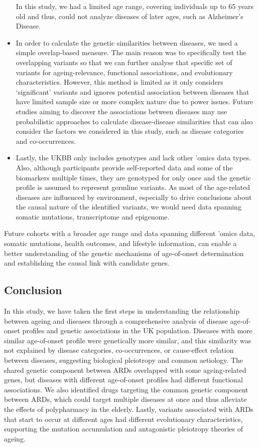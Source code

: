 \documentclass[12pt,twoside]{unicam}
\begin{document}
\begin{itemize}
  In this study, we had a limited age range, covering individuals up to 65 years old and thus, could not analyze diseases of later ages, such as Alzheimer's Disease.
\item
  In order to calculate the genetic similarities between diseases, we used a simple overlap-based measure. The main reason was to specifically test the overlapping variants so that we can further analyse that specific set of variants for ageing-relevance, functional associations, and evolutionary characteristics. However, this method is limited as it only considers `significant' variants and ignores potential association between diseases that have limited sample size or more complex nature due to power issues. Future studies aiming to discover the associations between diseases may use probabilistic approaches to calculate disease-disease similarities that can also consider the factors we considered in this study, such as disease categories and co-occurrences.
\item
  Lastly, the UKBB only includes genotypes and lack other 'omics data types. Also, although participants provide self-reported data and some of the biomarkers multiple times, they are genotyped for only once and the genetic profile is assumed to represent germline variants. As most of the age-related diseases are influenced by environment, especially to drive conclusions about the causal nature of the identified variants, we would need data spanning somatic mutations, transcriptome and epigenome.
\end{itemize}

Future cohorts with a broader age range and data spanning different 'omics data, somatic mutations, health outcomes, and lifestyle information, can enable a better understanding of the genetic mechanisms of age-of-onset determination and establishing the causal link with candidate genes.

\hypertarget{conclusion-1}{%
\subsection{Conclusion}\label{conclusion-1}}

In this study, we have taken the first steps in understanding the relationship between ageing and diseases through a comprehensive analysis of disease age-of-onset profiles and genetic associations in the UK population. Diseases with more similar age-of-onset profile were genetically more similar, and this similarity was not explained by disease categories, co-occurrences, or cause-effect relation between diseases, suggesting biological pleiotropy and common aetiology. The shared genetic component between ARDs overlapped with some ageing-related genes, but diseases with different age-of-onset profiles had different functional associations. We also identified drugs targeting the common genetic component between ARDs, which could target multiple diseases at once and thus alleviate the effects of polypharmacy in the elderly. Lastly, variants associated with ARDs that start to occur at different ages had different evolutionary characteristics, supporting the mutation accumulation and antagonistic pleiotropy theories of ageing.
\end{document}
